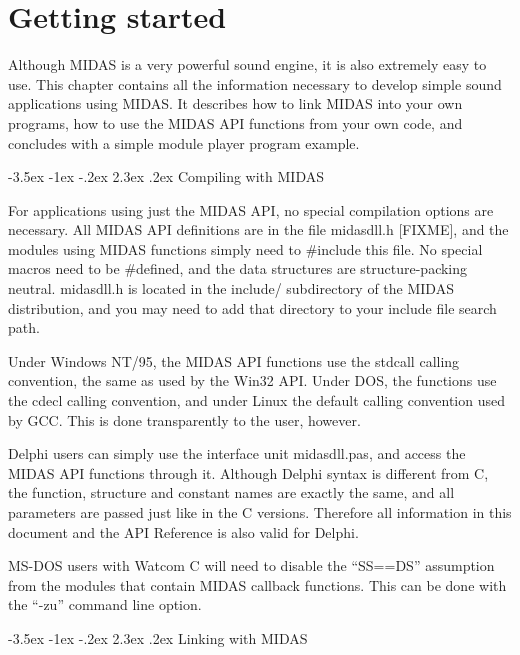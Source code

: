 \documentclass[a4paper,12pt,oneside]{book}
\makeatletter
\renewcommand\section{\@startsection {section}{1}{-20pt}%
                                   {-3.5ex \@plus -1ex \@minus -.2ex}%
                                   {2.3ex \@plus.2ex}%
                                   {\normalfont\Large\bfseries}}
\newcommand{\mResWord}[1]{{\ttfamily #1}}
\newcommand{\mFileName}[1]{{\ttfamily #1}}
\makeatother
\begin{document}
\chapter{Getting started}

Although MIDAS is a very powerful sound engine, it is also extremely
easy to use. This chapter contains all the information necessary to develop
simple sound applications using MIDAS. It describes how to link MIDAS into
your own programs, how to use the MIDAS API functions from your own code, and
concludes with a simple module player program example.


\section{Compiling with MIDAS}

For applications using just the MIDAS API, no special compilation options are
necessary. All MIDAS API definitions are in the file \mFileName{midasdll.h}
[FIXME], and the modules using MIDAS functions simply need to
\mResWord{\#{}include} this file. No special macros need to be
\mResWord{\#{}define}d, and the data structures are structure-packing neutral.
\mFileName{midasdll.h} is located in the \mFileName{include/} subdirectory of
the MIDAS distribution, and you may need to add that directory to your
include file search path.

Under Windows NT/95, the MIDAS API functions use the \mResWord{stdcall}
calling convention, the same as used by the Win32 API. Under DOS, the
functions use the \mResWord{cdecl} calling convention, and under Linux the
default calling convention used by GCC. This is done transparently to the
user, however.

Delphi users can simply use the interface unit \mFileName{midasdll.pas}, and
access the MIDAS API functions through it. Although Delphi syntax is
different from C, the function, structure and constant names are exactly the
same, and all parameters are passed just like in the C versions. Therefore
all information in this document and the API Reference is also valid for
Delphi.

MS-DOS users with Watcom C will need to disable the ``SS==DS'' assumption
from the modules that contain MIDAS callback functions. This can be done
with the ``\mResWord{-zu}'' command line option.



\section{Linking with MIDAS}
\end{document}
